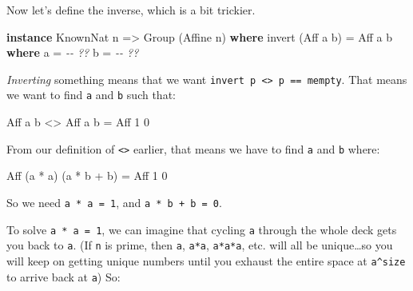 \documentclass[]{article}
\newenvironment{Shaded}{}{}
\newcommand{\CommentTok}[1]{\textcolor[rgb]{0.38,0.63,0.69}{\textit{#1}}}
\newcommand{\DataTypeTok}[1]{\textcolor[rgb]{0.56,0.13,0.00}{#1}}
\newcommand{\DecValTok}[1]{\textcolor[rgb]{0.25,0.63,0.44}{#1}}
\newcommand{\KeywordTok}[1]{\textcolor[rgb]{0.00,0.44,0.13}{\textbf{#1}}}
\newcommand{\NormalTok}[1]{#1}
\newcommand{\OperatorTok}[1]{\textcolor[rgb]{0.40,0.40,0.40}{#1}}
\newcommand{\OtherTok}[1]{\textcolor[rgb]{0.00,0.44,0.13}{#1}}
\begin{document}
Now let's define the inverse, which is a bit trickier.

\begin{Shaded}
\begin{Highlighting}[]
\KeywordTok{instance} \DataTypeTok{KnownNat}\NormalTok{ n }\OtherTok{=\textgreater{}} \DataTypeTok{Group}\NormalTok{ (}\DataTypeTok{Affine}\NormalTok{ n) }\KeywordTok{where}
\NormalTok{    invert (}\DataTypeTok{Aff}\NormalTok{ a b) }\OtherTok{=} \DataTypeTok{Aff}\NormalTok{ a\textquotesingle{} b\textquotesingle{}}
      \KeywordTok{where}
\NormalTok{        a\textquotesingle{} }\OtherTok{=} \CommentTok{{-}{-} ??}
\NormalTok{        b\textquotesingle{} }\OtherTok{=} \CommentTok{{-}{-} ??}
\end{Highlighting}
\end{Shaded}

\emph{Inverting} something means that we want
\texttt{invert\ p\ \textless{}\textgreater{}\ p\ ==\ mempty}. That means we want
to find \texttt{a\textquotesingle{}} and \texttt{b\textquotesingle{}} such that:

\begin{Shaded}
\begin{Highlighting}[]
      \DataTypeTok{Aff}\NormalTok{ a\textquotesingle{} b\textquotesingle{} }\OperatorTok{\textless{}\textgreater{}} \DataTypeTok{Aff}\NormalTok{ a b }\OtherTok{=} \DataTypeTok{Aff} \DecValTok{1} \DecValTok{0}
\end{Highlighting}
\end{Shaded}

From our definition of \texttt{\textless{}\textgreater{}} earlier, that means we
have to find \texttt{a\textquotesingle{}} and \texttt{b\textquotesingle{}}
where:

\begin{Shaded}
\begin{Highlighting}[]
\DataTypeTok{Aff}\NormalTok{ (a\textquotesingle{} }\OperatorTok{*}\NormalTok{ a) (a\textquotesingle{} }\OperatorTok{*}\NormalTok{ b }\OperatorTok{+}\NormalTok{ b\textquotesingle{}) }\OtherTok{=} \DataTypeTok{Aff} \DecValTok{1} \DecValTok{0}
\end{Highlighting}
\end{Shaded}

So we need \texttt{a\textquotesingle{}\ *\ a\ =\ 1}, and
\texttt{a\textquotesingle{}\ *\ b\ +\ b\textquotesingle{}\ =\ 0}.

To solve \texttt{a\textquotesingle{}\ *\ a\ =\ 1}, we can imagine that cycling
\texttt{a} through the whole deck gets you back to \texttt{a}. (If \texttt{n} is
prime, then \texttt{a}, \texttt{a*a}, \texttt{a*a*a}, etc. will all be
unique\ldots so you will keep on getting unique numbers until you exhaust the
entire space at \texttt{a\^{}size} to arrive back at \texttt{a}) So:
\end{document}
